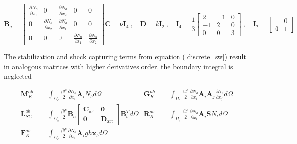 \documentclass[a4paper,12pt]{article}
\newcommand{\pder}[2]{\frac{\partial#1}{\partial#2}}
\begin{document}
\begin{subequations}
\begin{equation}
\mathbf{B}_a = \left[\begin{matrix}
    \pder{N_a}{x_1} & 0 & \pder{N_a}{x_2} & 0 & 0 \\
    0 & \pder{N_a}{x_2} & \pder{N_a}{x_1} & 0 & 0 \\
    0 & 0 & 0 & \pder{N_a}{x_1} & \pder{N_a}{x_2}
\end{matrix}\right]
\end{equation}
\begin{equation}
\mathbf{C} = \nu \mathbf{I}_4 \ , \quad
\mathbf{D} = k \mathbf{I}_2 \ , \quad
\mathbf{I}_4 = \frac{1}{3} \left[\begin{matrix}
        2 & -1 & 0 \\
        -1 & 2 & 0 \\
        0 & 0 & 3
    \end{matrix}\right] \ , \quad
\mathbf{I}_2 = \left[\begin{matrix}
        1 & 0 \\
        0 & 1
    \end{matrix}\right]
\end{equation}
\end{subequations}

The stabilization and shock capturing terms from equation (\ref{discrete_sw}) result in analogous matrices with higher derivatives order, the boundary integral is neglected

\begin{align}
\displaystyle\mathbf{M}_K^{ab} &= \int_{\Omega_e} \frac{\beta l^e}{2} \pder{N_a}{x_i}\mathbf{A}_i N_b d\Omega &
\displaystyle\mathbf{G}_K^{ab} &= \int_{\Omega_e} \frac{\beta l^e}{2} \pder{N_a}{x_i}\mathbf{A}_i\mathbf{A}_j \pder{N_b}{x_j} d\Omega \nonumber\\
\displaystyle\mathbf{L}_{SC}^{ab} &= \int_{\Omega_e} \frac{\beta l^e}{2} \mathbf{B}_a \left[\begin{matrix}
        \mathbf{C}_\text{art} & \mathbf{0} \\ \mathbf{0} & \mathbf{D}_\text{art}
    \end{matrix}\right] \mathbf{B}_b^T d\Omega &
\displaystyle\mathbf{R}_K^{ab} &= \int_{\Omega_e} \frac{\beta l^e}{2} \pder{N_a}{x_i}\mathbf{A}_i \mathbf{S} N_b d\Omega \\
\displaystyle\mathbf{F}_K^{ab} &= \int_{\Omega_e} \frac{\beta l^e}{2} \pder{N_a}{x_i}\mathbf{A}_i gh\mathbf{x}_b d\Omega
\nonumber
\end{align}
\end{document}
